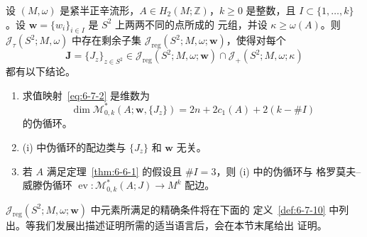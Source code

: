 \begin{theorem}\label{thm:6-7-1}
设 $(M,\omega)$ 是紧半正辛流形，$A\in H_2(M;\mathbb Z)$，$k\ge0$ 是整数，且
$I\subset\{1,\ldots,k\}$。设 $\mathbf w=\{w_i\}_{i\in I}$ 是 $S^2$ 上两两不同的点所成的
元组，并设 $\kappa\ge\omega(A)$。则
$\mathcal J_\tau(S^2;M,\omega)$ 中存在剩余子集
$\mathcal J_{\mathrm{reg}}(S^2;M,\omega;\mathbf w)$，使得对每个
\[
  \mathbf J=\{J_z\}_{z\in S^2}
  \in\mathcal J_{\mathrm{reg}}(S^2;M,\omega;\mathbf w)
    \cap\mathcal J_+(S^2;M,\omega;\kappa)
\]
都有以下结论。
\begin{enumerate}[label=\textup{(\roman*)},leftmargin=3em]
\item {}求值映射~\eqref{eq:6-7-2} 是维数为
\[
  \dim\mathcal M^*_{0,k}(A;\mathbf w,\{J_z\})
  =2n+2c_1(A)+2(k-\#I)
\]
的伪循环。
\item (i) 中伪循环的配边类与 $\{J_z\}$ 和 $\mathbf w$ 无关。
\item 若 $A$ 满足定理~\ref{thm:6-6-1} 的假设且 $\#I=3$，则 (i) 中的伪循环与
格罗莫夫--威滕伪循环
$\operatorname{ev}:\mathcal M^*_{0,k}(A;J)\to M^k$ 配边。
\end{enumerate}
\end{theorem}

$\mathcal J_{\mathrm{reg}}(S^2;M,\omega;\mathbf w)$ 中元素所满足的精确条件将在下面的
定义~\ref{def:6-7-10} 中列出。等我们发展出描述证明所需的适当语言后，会在本节末尾给出
证明。

